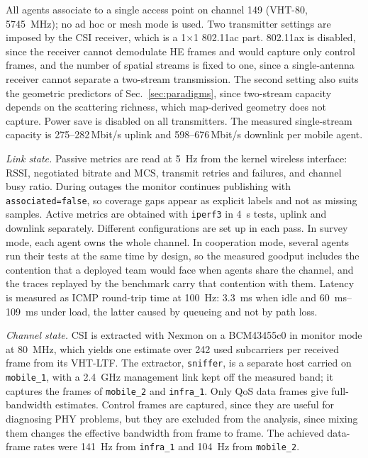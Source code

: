 \documentclass[conference]{IEEEtran}
\begin{document}
All agents associate to a single access point on channel 149 (VHT-80,
\SI{5745}{\mega\hertz}); no ad hoc or mesh mode is used. Two
transmitter settings are imposed by the CSI receiver, which is a
1$\times$1 802.11ac part. 802.11ax is disabled, since the receiver
cannot demodulate HE frames and would capture only control frames,
and the number of spatial streams is fixed to one, since a
single-antenna receiver cannot separate a two-stream transmission.
The second setting also suits the geometric predictors of
Sec.~\ref{sec:paradigms}, since two-stream capacity depends on the
scattering richness, which map-derived geometry does not capture.
Power save is disabled on all transmitters. The measured
single-stream capacity is \numrange{275}{282}\,Mbit/s uplink and
\numrange{598}{676}\,Mbit/s downlink per mobile agent.

\emph{Link state.} Passive metrics are read at \SI{5}{\hertz} from
the kernel wireless interface: RSSI, negotiated bitrate and MCS,
transmit retries and failures, and channel busy ratio. During
outages the monitor continues publishing with
\texttt{associated=false}, so coverage gaps appear as explicit
labels and not as missing samples. Active metrics are obtained with
\texttt{iperf3} \cite{iperf3} in \SI{4}{\second} tests, uplink and
downlink separately. Different configurations are set up in each
pass. In survey mode, each agent owns the whole channel. In
cooperation mode, several agents run their tests at the same time by
design, so the measured goodput includes the contention that a
deployed team would face when agents share the channel, and the
traces replayed by the benchmark carry that contention with them.
Latency is measured as ICMP round-trip time at \SI{100}{\hertz}:
\SI{3.3}{\milli\second} when idle and
\SIrange{60}{109}{\milli\second} under load, the latter caused by
queueing and not by path loss.

\emph{Channel state.} CSI is extracted with Nexmon \cite{nexmon} on
a BCM43455c0 in monitor mode at \SI{80}{\mega\hertz}, which yields
one estimate over 242 used subcarriers per received frame from its
VHT-LTF. The extractor, \texttt{sniffer}, is a separate host carried
on \texttt{mobile\_1}, with a \SI{2.4}{\giga\hertz} management link
kept off the measured band; it captures the frames of
\texttt{mobile\_2} and \texttt{infra\_1}. Only QoS data frames give
full-bandwidth estimates. Control frames are captured, since they are
useful for diagnosing PHY problems, but they are excluded from the
analysis, since mixing them changes the effective bandwidth from
frame to frame. The achieved data-frame rates were \SI{141}{\hertz}
from \texttt{infra\_1} and \SI{104}{\hertz} from \texttt{mobile\_2}.
\end{document}
